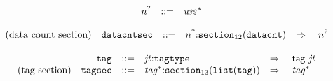 $$
\begin{array}[t]{@{}lrrl@{}l@{}}
& {n^?} & ::= & {{\mathit{u{\kern-0.1em\scriptstyle 32}}}^\ast} \\
\end{array}
$$

$$
\begin{array}[t]{@{}lrrl@{}l@{}l@{}l@{}}
\mbox{(data count section)} & {\mathtt{datacntsec}} & ::= & {n^?}{:}{{\mathtt{section}}}_{12}({\mathtt{datacnt}}) & \quad\Rightarrow\quad{} & {n^?} \\
\end{array}
$$

\vspace{1ex}

$$
\begin{array}[t]{@{}lrrl@{}l@{}l@{}l@{}}
& {\mathtt{tag}} & ::= & {\mathit{jt}}{:}{\mathtt{tagtype}} & \quad\Rightarrow\quad{} & \mathsf{tag}~{\mathit{jt}} \\
\mbox{(tag section)} & {\mathtt{tagsec}} & ::= & {{\mathit{tag}}^\ast}{:}{{\mathtt{section}}}_{13}({\mathtt{list}}({\mathtt{tag}})) & \quad\Rightarrow\quad{} & {{\mathit{tag}}^\ast} \\
\end{array}
$$

\vspace{1ex}


